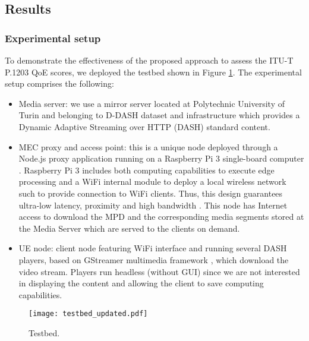 \subsection{Results}

\label{sec:MTAP20204}
\subsubsection{Experimental setup}
\label{sec:MTAP202041}

To demonstrate the effectiveness of the proposed approach to assess the ITU-T P.1203 \cite{itup1203} QoE scores, we deployed the testbed shown in Figure \ref{fig:MTAP2020testbed}. The experimental setup comprises the following:
\begin{itemize}
	\item Media server: we use a mirror server located at Polytechnic University of Turin and belonging to D-DASH dataset and infrastructure \cite{lederer2013} which provides a Dynamic Adaptive Streaming over HTTP (DASH) standard content.
	\item MEC proxy and access point: this is a unique node deployed through a Node.js \cite{nodejs} proxy application running on a Raspberry Pi 3 single-board computer \cite{richardson2012}. Raspberry Pi 3 includes both computing capabilities to execute edge processing and a WiFi internal module to deploy a local wireless network such to provide connection to WiFi clients. Thus, this design guarantees ultra-low latency, proximity and high bandwidth \cite{etsigsmecwifi}. This node has Internet access to download the MPD and the corresponding media segments stored at the Media Server which are served to the clients on demand.
	\item UE node: client node featuring WiFi interface and running several DASH players, based on GStreamer multimedia framework \cite{gstreamer}, which download the video stream. Players run headless (without GUI) since we are not interested in displaying the content and allowing the client to save computing capabilities.
\end{itemize}

\begin{figure}[htp]
	\centering
	\texttt{[image: testbed\_updated.pdf]}
	\caption{Testbed.}
	\label{fig:MTAP2020testbed} %
\end{figure}
%

